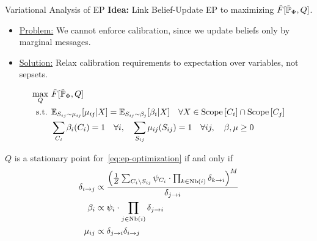 \begin{frame}{Variational Analysis of EP}
\textbf{Idea:} Link Belief-Update EP to maximizing $\tilde{F}[\tilde{\Pb}_{\Phi},Q]$.
\begin{itemize}
    \pause \item \underline{Problem:} We cannot enforce calibration, since we update beliefs only by marginal messages.
    \pause \item \underline{Solution:} Relax calibration requirements to expectation over variables, not sepsets.
\end{itemize}
\pause
\begin{equation}
    \label{eq:ep-optimization}
    \begin{aligned}
        \max_{Q}\ & \tilde{F}[\tilde{\Pb}_{\Phi}, Q] \\
        \text{s.t. } & \E_{S_{ij} \sim \mu_{ij}}[\mu_{ij} | X] = \E_{S_{ij} \sim \beta_j}[\beta_{i} | X] \quad \forall X \in \Scope[C_i] \cap \Scope[C_j] \\
        & \sum_{C_i} \beta_i(C_i) = 1  \quad \forall i,
        \quad \sum_{S_{ij}} \mu_{ij}(S_{ij}) = 1 \quad \forall ij, 
        \quad \beta, \mu \geq 0
    \end{aligned}
\end{equation}
\pause
\begin{theorem}
    $Q$ is a stationary point for~\eqref{eq:ep-optimization} if and only if
    \begin{equation}
        \begin{aligned}
            \delta_{i \rightarrow j} & \propto \frac{\left(\frac{1}{Z} \sum_{C_i \setminus S_{ij}} \psi_{C_i} \cdot \prod_{k \in \text{Nb}(i)} \delta_{k \rightarrow i}\right)^M}{\delta_{j \rightarrow i}} \\
            \beta_i & \propto \psi_i \cdot \prod_{j \in \text{Nb}(i)} \delta_{j \rightarrow i} \\
            \mu_{ij} & \propto \delta_{j \rightarrow i} \delta_{i \rightarrow j}
        \end{aligned}
    \end{equation}
\end{theorem}
\end{frame}

